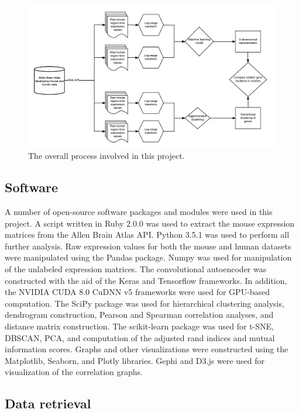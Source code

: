 \documentclass[12pt,oneside,onecolumn,a4paper]{article}
\begin{document}
\begin{figure}[H]
\begin{center}
\includegraphics[width=\columnwidth]{figures/workflow}
\caption{The overall process involved in this project. \label{fig:workflow}%
}
\end{center}
\end{figure}

\subsection{Software}

A number of open-source software packages and modules were used in this project. A script written in Ruby 2.0.0 was used to extract the mouse expression matrices from the Allen Brain Atlas API. Python 3.5.1 was used to perform all further analysis. Raw expression values for both the mouse and human datasets were manipulated using the Pandas package. Numpy was used for manipulation of the unlabeled expression matrices. The convolutional autoencoder was constructed with the aid of the Keras and Tensorflow \citep{tensorflow2015-whitepaper} frameworks. In addition, the NVIDIA CUDA 8.0 CuDNN v5 frameworks were used for GPU-based computation. The SciPy package was used for hierarchical clustering analysis, dendrogram construction, Pearson and Spearman correlation analyses, and distance matrix construction. The scikit-learn package was used for t-SNE, DBSCAN, PCA, and computation of the adjusted rand indices and mutual information scores. Graphs and other visualizations were constructed using the Matplotlib, Seaborn, and Plotly libraries. Gephi and D3.js were used for visualization of the correlation graphs.

\subsection{Data retrieval}
\end{document}
